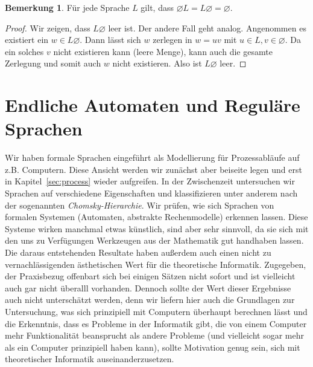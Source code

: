 \documentclass[11pt, a4paper]{article}
\theoremstyle{definition}
\newtheorem*{remark*}{Bemerkung}
\theoremstyle{plain}
\numberwithin{equation}{section}
\let\emptyset\varnothing
\begin{document}
\begin{remark*}
	Für jede Sprache \( L \) gilt, dass \( \emptyset L = L \emptyset = \emptyset \).
	\begin{proof}
		Wir zeigen, dass \( L \emptyset \) leer ist. Der andere Fall geht analog. Angenommen es existiert ein \( w \in L \emptyset \). Dann lässt sich \( w \) zerlegen in \( w = uv \) mit \( u \in L, v \in \emptyset \). Da ein solches \( v \) nicht existieren kann (leere Menge), kann auch die gesamte Zerlegung und somit auch \( w \) nicht existieren. Also ist \( L \emptyset \) leer.
	\end{proof}
\end{remark*}



\newpage
\section{Endliche Automaten und Reguläre Sprachen}\label{sec:regular}
Wir haben formale Sprachen eingeführt als Modellierung für Prozessabläufe auf z.B. Computern. Diese Ansicht werden wir zunächst aber beiseite legen und erst in Kapitel~\ref{sec:process} wieder aufgreifen. In der Zwischenzeit untersuchen wir Sprachen auf verschiedene Eigenschaften und klassifizieren unter anderem nach der sogenannten \textit{Chomsky-Hierarchie}. Wir prüfen, wie sich Sprachen von formalen Systemen (Automaten, abstrakte Rechenmodelle) erkennen lassen. Diese Systeme wirken manchmal etwas künstlich, sind aber sehr sinnvoll, da sie sich mit den uns zu Verfügungen Werkzeugen aus der Mathematik gut handhaben lassen. Die daraus entstehenden Resultate haben außerdem auch einen nicht zu vernachlässigenden ästhetischen Wert für die theoretische Informatik. Zugegeben, der Praxisbezug offenbart sich bei einigen Sätzen nicht sofort und ist vielleicht auch gar nicht überalll vorhanden. Dennoch sollte der Wert dieser Ergebnisse auch nicht unterschätzt werden, denn wir liefern hier auch die Grundlagen zur Untersuchung, was sich prinzipiell mit Computern überhaupt berechnen lässt und die Erkenntnis, dass es Probleme in der Informatik gibt, die von einem Computer mehr Funktionalität beansprucht als andere Probleme (und vielleicht sogar mehr als ein Computer prinzipiell haben kann), sollte Motivation genug sein, sich mit theoretischer Informatik auseinanderzusetzen.
\end{document}
